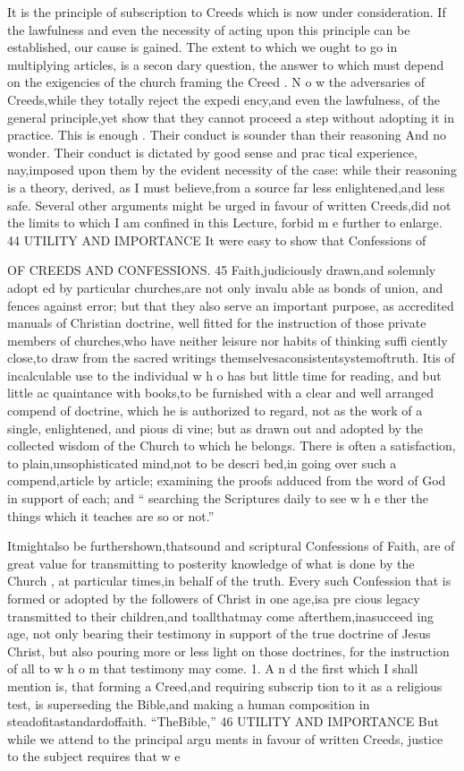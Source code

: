\documentclass[
]{book}
\begin{document}
It is the principle of subscription to Creeds which is now under consideration. If the
lawfulness and even the necessity of acting upon this principle can be established, our cause is gained. The extent to which we ought to go in multiplying articles, is a secon dary question, the answer to which must depend on the exigencies of the church framing the Creed . N o w the adversaries of
Creeds,while they totally reject the expedi ency,and even the lawfulness, of the general
principle,yet show that they cannot proceed a step without adopting it in practice. This
is enough . Their conduct is sounder than their reasoning And no wonder. Their
conduct is dictated by good sense and prac
tical experience, nay,imposed upon them by
the evident necessity of the case: while their
reasoning is a theory, derived, as I must
believe,from a source far less enlightened,and less safe.
Several other arguments might be urged in favour of written Creeds,did not the limits to
which I am confined in this Lecture, forbid m e further to enlarge.
44
UTILITY AND IMPORTANCE
It were easy to show that Confessions of

OF CREEDS AND CONFESSIONS. 45
Faith,judiciously drawn,and solemnly adopt ed by particular churches,are not only invalu able as bonds of union, and fences against error; but that they also serve an important purpose, as accredited manuals of Christian doctrine, well fitted for the instruction of those private members of churches,who have neither leisure nor habits of thinking suffi ciently close,to draw from the sacred writings themselvesaconsistentsystemoftruth. Itis of incalculable use to the individual w h o has
but little time for reading, and but little ac quaintance with books,to be furnished with a
clear and well arranged compend of doctrine, which he is authorized to regard, not as the
work of a single, enlightened, and pious di vine; but as drawn out and adopted by the collected wisdom of the Church to which he
belongs. There is often a satisfaction, to plain,unsophisticated mind,not to be descri
bed,in going over such a compend,article by article; examining the proofs adduced from the word of God in support of each; and `` searching the Scriptures daily to see w h e
ther the things which it teaches are so or not.''

Itmightalso be furthershown,thatsound and scriptural Confessions of Faith, are of great value for transmitting to posterity knowledge of what is done by the Church , at particular times,in behalf of the truth. Every such Confession that is formed or adopted by the followers of Christ in one age,isa pre
cious legacy transmitted to their children,and toallthatmay come afterthem,inasucceed ing age, not only bearing their testimony in support of the true doctrine of Jesus Christ,
but also pouring more or less light on those doctrines, for the instruction of all to w h o m that testimony may come.
1. A n d the first which I shall mention is, that forming a Creed,and requiring subscrip tion to it as a religious test, is superseding the
Bible,and making a human composition in steadofitastandardoffaith. ``TheBible,''
46 UTILITY AND IMPORTANCE
But while we attend to the principal argu ments in favour of written Creeds, justice to
the subject requires that w e
\end{document}
